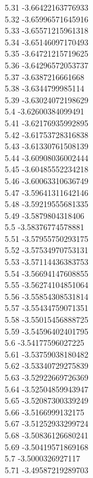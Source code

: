 {5.31	-3.66422163776933\\
5.32	-3.65996571645916\\
5.33	-3.65571215961318\\
5.34	-3.65146097170493\\
5.35	-3.64721215719625\\
5.36	-3.64296572053737\\
5.37	-3.6387216661668\\
5.38	-3.6344799985114\\
5.39	-3.63024072198629\\
5.4	-3.62600384099491\\
5.41	-3.62176935992895\\
5.42	-3.61753728316838\\
5.43	-3.61330761508139\\
5.44	-3.60908036002444\\
5.45	-3.60485552234218\\
5.46	-3.60063310636749\\
5.47	-3.59641311642146\\
5.48	-3.59219555681335\\
5.49	-3.5879804318406\\
5.5	-3.58376774578881\\
5.51	-3.57955750293175\\
5.52	-3.57534970753131\\
5.53	-3.57114436383753\\
5.54	-3.56694147608855\\
5.55	-3.56274104851064\\
5.56	-3.55854308531814\\
5.57	-3.55434759071351\\
5.58	-3.55015456888725\\
5.59	-3.54596402401795\\
5.6	-3.54177596027225\\
5.61	-3.53759038180482\\
5.62	-3.53340729275839\\
5.63	-3.52922669726369\\
5.64	-3.52504859943947\\
5.65	-3.52087300339249\\
5.66	-3.5166999132175\\
5.67	-3.51252933299724\\
5.68	-3.50836126680241\\
5.69	-3.50419571869168\\
5.7	-3.5000326927117\\
5.71	-3.49587219289703\\
}
